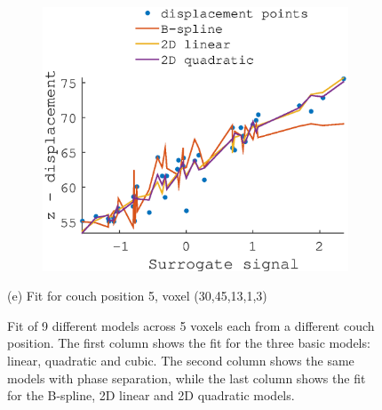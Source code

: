 \documentclass[11pt,a4paper,oneside]{report}
\begin{document}
\begin{figure}
\begin{subfigure}[b]{0.33\textwidth}
  \end{subfigure}
    ~ %
  \begin{subfigure}[b]{0.33\textwidth}
    \includegraphics[width=\textwidth, trim=0 0 0 110,clip=true]{figures/task2/fit_round3_couch5.eps}
  \end{subfigure}
  (e) Fit for couch position 5, voxel (30,45,13,1,3)
  \vspace*{1em}

  
  \caption{Fit of 9 different models across 5 voxels each from a different couch position. The first column shows the fit for the three basic models: linear, quadratic and cubic. The second column shows the same models with phase separation, while the last column shows the fit for the B-spline, 2D linear and 2D quadratic models.}
  \label{fig:c2fit}
  
\end{figure}
\end{document}
